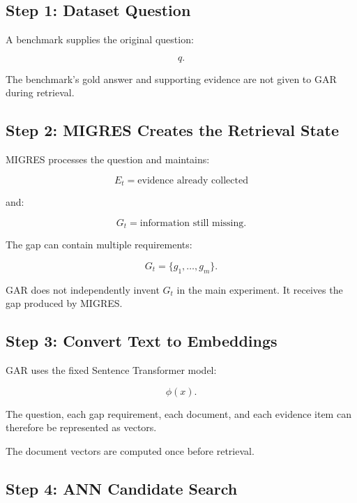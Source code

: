 \documentclass[11pt,a4paper]{article}
\begin{document}

\subsection{Step 1: Dataset Question}

A benchmark supplies the original question:

\[
q.
\]

The benchmark's gold answer and supporting evidence are not given to GAR during retrieval.

\subsection{Step 2: MIGRES Creates the Retrieval State}

MIGRES processes the question and maintains:

\[
E_t=\text{evidence already collected}
\]

and:

\[
G_t=\text{information still missing}.
\]

The gap can contain multiple requirements:

\[
G_t=\{g_1,\ldots,g_m\}.
\]

GAR does not independently invent $G_t$ in the main experiment. It receives the gap produced by MIGRES.

\subsection{Step 3: Convert Text to Embeddings}

GAR uses the fixed Sentence Transformer model:

\[
\phi(x).
\]

The question, each gap requirement, each document, and each evidence item can therefore be represented as vectors.

The document vectors are computed once before retrieval.

\subsection{Step 4: ANN Candidate Search}
\end{document}
